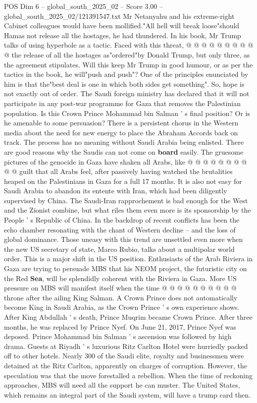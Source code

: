 \begin{textsample}{POS Dim 6 – global\_south\_2025\_02 – Score 3.00 – global\_south\_2025\_02/121391547.txt}
Mr Netanyahu and his extreme-right Cabinet colleagues would have been mollified."All hell will break loose"should Hamas not release all the hostages, he had thundered.
In his book, Mr Trump talks of using hyperbole as a tactic.
Faced with this threat, @ @ @ @ @ @ @ @ @ @ the release of all the hostages as"ordered"by Donald Trump, but only three, as the agreement stipulates.
Will this keep Mr Trump in good humour, or as per the tactics in the book, he will"push and push"?
One of the principles enunciated by him is that the"best deal is one in which both sides get something".
So, hope is not exactly out of order.
The Saudi foreign ministry has declared that it will not participate in any post-war programme for Gaza that removes the Palestinian population.
Is this Crown Prince Mohammad bin Salman ' s final position?
Or is he amenable to some persuasion?
There is a persistent chorus in the Western media about the need for new energy to place the Abraham Accords back on track.
The process has no meaning without Saudi Arabia being enlisted.
There are good reasons why the Saudis can not come on \textbf{board} easily.
The gruesome pictures of the genocide in Gaza have shaken all Arabs, like @ @ @ @ @ @ @ @ @ @ guilt that all Arabs feel, after passively having watched the brutalities heaped on the Palestinians in Gaza for a full 17 months.
It is also not easy for Saudi Arabia to abandon its entente with Iran, which had been diligently supervised by China.
The Saudi-Iran rapprochement is bad enough for the West and the Zionist combine, but what riles them even more is its sponsorship by the People ' s Republic of China.
In the backdrop of recent conflicts has been the echo chamber resonating with the chant of Western decline -- and the loss of global dominance.
Those uneasy with this trend are unsettled even more when the new US secretary of state, Marco Rubio, talks about a multipolar world order.
This is a major shift in the US position.
Enthusiasts of the Arab Riviera in Gaza are trying to persuade MBS that his NEOM project, the futuristic city on the Red \textbf{Sea}, will be splendidly coherent with the Riviera in Gaza.
More US pressure on MBS will manifest itself when the time @ @ @ @ @ @ @ @ @ @ throne after the ailing King Salman.
A Crown Prince does not automatically become King in Saudi Arabia, as the Crown Prince ' s own experience shows.
After King Abdullah ' s death, Prince Muqrim became Crown Prince.
After three months, he was replaced by Prince Nyef.
On June 21, 2017, Prince Nyef was deposed.
Prince Mohammad bin Salman ' s ascension was followed by high drama.
Guests at Riyadh ' s luxurious Ritz Carlton Hotel were hurriedly packed off to other hotels.
Nearly 300 of the Saudi elite, royalty and businessmen were detained at the Ritz Carlton, apparently on charges of corruption.
However, the speculation was that the move forestalled a rebellion.
When the time of reckoning approaches, MBS will need all the support he can muster.
The United States, which remains an integral part of the Saudi system, will have a trump card then.

\end{textsample}
